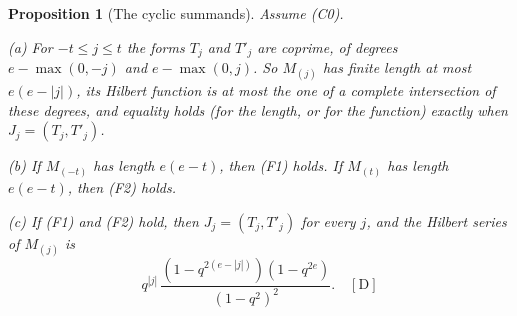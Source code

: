 \documentclass[11pt]{article}
\newtheorem{proposition}{Proposition}
\theoremstyle{definition}
\theoremstyle{remark}
\begin{document}
\begin{proposition}[The cyclic summands]\label{prop:exptcyclic}
Assume (C0).

(a) For $-t\le j\le t$ the forms $T_j$ and $T'_j$ are coprime, of degrees $e-\max(0,-j)$ and $e-\max(0,j)$. So $M_{(j)}$ has finite length at most $e(e-|j|)$, its Hilbert function is at most the one of a complete intersection of these degrees, and equality holds (for the length, or for the function) exactly when $J_j=(T_j,T'_j)$.

(b) If $M_{(-t)}$ has length $e(e-t)$, then (F1) holds. If $M_{(t)}$ has length $e(e-t)$, then (F2) holds.

(c) If (F1) and (F2) hold, then $J_j=(T_j,T'_j)$ for every $j$, and the Hilbert series of $M_{(j)}$ is
\[
q^{|j|}\,\frac{(1-q^{2(e-|j|)})(1-q^{2e})}{(1-q^2)^2}.\quad[\mathrm D]
\]
\end{proposition}
\end{document}
